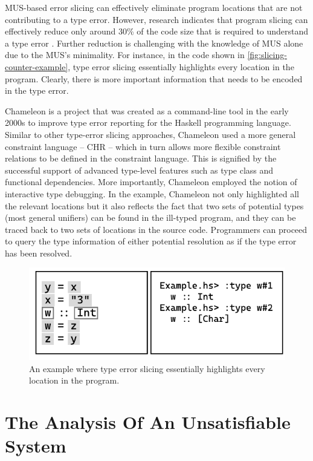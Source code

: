 MUS-based error slicing can effectively eliminate program locations that are not contributing to a type error. However, research indicates that program slicing can effectively reduce only around 30\% of the code size that is required to understand a type error \cite{binkley_empirical_2007}. Further reduction is challenging with the knowledge of MUS alone due to the MUS's minimality. For instance, in the code shown in \ref{fig:slicing-counter-example}, type error slicing essentially highlights every location in the program. Clearly, there is more important information that needs to be encoded in the type error.

Chameleon \cite{Stuckey2003-pz} is a project that was created as a command-line tool in the early 2000s to improve type error reporting 
for the Haskell programming language. Similar to other type-error slicing approaches, Chameleon used a more general constraint language -- CHR -- which in turn allows more flexible constraint relations to be defined in the constraint language. This is signified by the successful support of advanced type-level features such as type class and functional dependencies. More importantly, Chameleon employed the notion of interactive type debugging. In the example, Chameleon not only highlighted all the relevant locations but it also reflects the fact that two sets of potential types (most general unifiers) can be found in the ill-typed program, and they can be traced back to two sets of locations in the source code. Programmers can proceed to query the type information of either potential resolution as if the type error has been resolved.


\begin{figure}[hbt]
  \includegraphics[width=0.8\linewidth]{ChameleonInteractive}
  \caption{
    \label{fig:chameleon-interactive}
      An example where type error slicing essentially highlights every location in the program.}
\end{figure}

\section{The Analysis Of An Unsatisfiable System}


